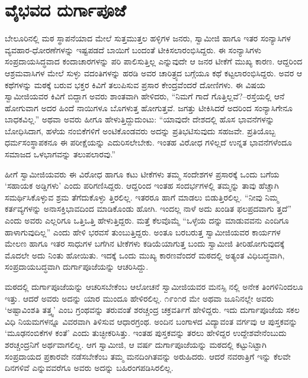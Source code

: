 
\chapter{ವೈಭವದ ದುರ್ಗಾಪೂಜೆ}

\noindent

ಬೇಲೂರಿನಲ್ಲಿ ಮಠ ಸ್ಥಾಪನೆಯಾದ ಮೇಲೆ ಸುತ್ತಮುತ್ತಲ ಹಳ್ಳಿಗಳ ಜನರು, ಸ್ವಾಮೀಜಿ ಹಾಗೂ ಇತರ ಸಂನ್ಯಾಸಿಗಳ ವ್ಯವಹಾರ-ಧೋರಣೆಗಳನ್ನು ಇಷ್ಟಪಡದೆ ಬಾಯಿಗೆ ಬಂದಂತೆ ಟೀಕಿಸಲಾರಂಭಿಸಿದ್ದರು. ಈ ಸಂನ್ಯಾಸಿಗಳು ಸಂಪ್ರದಾಯಸಿದ್ಧವಾದ ಕಂದಾಚಾರಗಳನ್ನು ಪರಿ ಪಾಲಿಸುತ್ತಿಲ್ಲ ಎನ್ನುವುದೇ ಆ ಜನರ ಟೀಕೆಗೆ ಮುಖ್ಯ ಕಾರಣ. ಆದ್ದರಿಂದ ಆಶ್ರಮವಾಸಿಗಳ ಮೇಲೆ ಸುಳ್ಳು ವದಂತಿಗಳನ್ನು ಹರಡಿ ಅವರ ಚಾರಿತ್ರ್ಯದ ಬಗ್ಗೆಯೂ ಕಥೆ ಕಟ್ಟಲಾರಂಭಿಸಿದ್ದರು. ಅವರ ಆ ಕಥೆಗಳನ್ನು ಮಠಕ್ಕೆ ಬರುವ ಭಕ್ತರ ಕಿವಿಗೆ ತಲುಪಿಸುವ ಪ್ರಸಾರ ಕೇಂದ್ರವೆಂದರೆ ದೋಣಿಗಳು. ಈ ವಿಷಯ ಸ್ವಾಮೀಜಿಯವರ ಕಿವಿಗೆ ಬಿದ್ದಾಗ ಅವರು ಶಾಂತವಾಗಿ ಹೇಳಿದರು, “ನಿಮಗೆ ಗಾದೆ ಗೊತ್ತಿಲ್ಲವೆ?–ರಸ್ತೆಯಲ್ಲಿ ಆನೆ ಹೋಗುವಾಗ ಅದರ ಹಿಂದೆ ನಾಯಿಗಳೂ ಬೊಗಳುತ್ತ ಹೋಗುತ್ತವೆ. ಜಗತ್ತು ಟೀಕಿಸಿದರೆ ಅದರಿಂದ ಸಂನ್ಯಾಸಿಗೇನೂ ಬಾಧಕವಿಲ್ಲ.” ಅಥವಾ ಅವರು ಹೀಗೂ ಹೇಳುತ್ತಿದ್ದುದುಂಟು: “ಯಾವುದೇ ದೇಶದಲ್ಲಿ ಹೊಸ ಭಾವನೆಗಳನ್ನು ಬೋಧಿಸಿದಾಗ, ಹಳೆಯ ನಂಬಿಕೆಗಳಿಗೆ ಅಂಟಿಕೊಂಡವರು ಅದನ್ನು ಪ್ರತಿಭಟಿಸುವುದು ಸಹಜವೇ. ಪ್ರತಿಯೊಬ್ಬ ಧರ್ಮಸಂಸ್ಥಾಪಕನೂ ಈ ಪರೀಕ್ಷೆಯನ್ನು ಎದುರಿಸಲೇಬೇಕು. ಇಂತಹ ವಿರೋಧ ಗಳಿಲ್ಲದೆ ಉನ್ನತ ಭಾವನೆಗಳೆಂದೂ ಸಮಾಜದ ಒಳಭಾಗವನ್ನು ತಲುಪಲಾರವು.”

ಹೀಗೆ ಸ್ವಾಮೀಜಿಯವರು ಈ ವಿರೋಧ ಹಾಗೂ ಕಟು ಟೀಕೆಗಳು ತಮ್ಮ ಸಂದೇಶಗಳ ಪ್ರಸಾರಕ್ಕೆ ಒಂದು ಬಗೆಯ ‘ಸಹಾಯಕ ಅಡ್ಡಿಗಳು’ ಎಂದು ಪರಿಗಣಿಸಿದ್ದರು. ಆದ್ದರಿಂದ ಇಂತಹ ಸಂದರ್ಭಗಳಲ್ಲಿ ತಮ್ಮನ್ನು ತಾವು ಹೆಚ್ಚಾಗಿ ಸಮರ್ಥಿಸಿಕೊಳ್ಳುವ ಶ್ರಮ ತೆಗೆದುಕೊಳ್ಳು ತ್ತಿರಲಿಲ್ಲ. ಇತರರೂ ಹಾಗೆ ಮಾಡಲು ಬಿಡುತ್ತಿರಲಿಲ್ಲ. “ನೀವು ನಿಮ್ಮ ಕರ್ತವ್ಯಗಳನ್ನು ಅನಾಸಕ್ತಿಭಾವದಿಂದ ಮಾಡಿಕೊಂಡು ಹೋಗಿ. ಇಂದಲ್ಲ ನಾಳೆ ಅದು ಖಂಡಿತ ಫಲಪ್ರದವಾಗು ತ್ತದೆ” ಎಂದು ಅವರು ಎಲ್ಲರಿಗೂ ಒತ್ತಿಒತ್ತಿ ಹೇಳುತ್ತಿದ್ದರು. ಮತ್ತೆ ಕೆಲವೊಮ್ಮೆ “ಒಳ್ಳೆಯ ದನ್ನು ಮಾಡುವವನು ಎಂದಿಗೂ ಹಾಳಾಗುವುದಿಲ್ಲ” ಎಂದು ಹೇಳಿ ಭರವಸೆ ತುಂಬುತ್ತಿದ್ದರು. ಅಂತೂ ಬರಬರುತ್ತ ಸ್ವಾಮೀಜಿಯವರ ಕಾರ್ಯಗಳ ಮೇಲಣ ಹಾಗೂ ಇತರ ಸಾಧುಗಳ ಬಗೆಗಿನ ಟೀಕೆಗಳು ಕಡಿಯೆಯಾಗುತ್ತ ಬಂದು ಸ್ವಾಮೀಜಿ ತೀರಿಹೋಗುವುದಕ್ಕೆ ಮೊದಲೇ ಅದು ನಿಂತು ಹೋಯಿತು. ಇದಕ್ಕೆ ಒಂದು ಮುಖ್ಯ ಕಾರಣವೆಂದರೆ ಮಠದಲ್ಲಿ ಅತ್ಯಂತ ವಿಧಿಬದ್ಧವಾಗಿ, ಸಂಪ್ರದಾಯಬದ್ಧವಾಗಿ ದುರ್ಗಾಪೂಜೆಯನ್ನು ಆಚರಿಸಿದ್ದು.

ಮಠದಲ್ಲಿ ದುರ್ಗಾಪೂಜೆಯನ್ನು ಆಚರಿಸಬೇಕೆಂಬ ಆಲೋಚನೆ ಸ್ವಾಮೀಜಿಯವರ ಮನಸ್ಸಿ ನಲ್ಲಿ ಅನೇಕ ತಿಂಗಳಿನಿಂದಲೂ ಇತ್ತು. ಆದರೆ ಅವರು ಅದನ್ನು ಯಾರ ಮುಂದೂ ಹೇಳಿರಲಿಲ್ಲ. ೧೯ಂ೧ರ ಮೇ ಅಥವಾ ಜೂನಿನಲ್ಲೇ ಅವರು ‘ಅಷ್ಟಾವಿಂಶತಿ ತತ್ತ್ವ’ ಎಂಬ ಗ್ರಂಥವನ್ನು ತರುವಂತೆ ಶರಚ್ಚಂದ್ರ ಚಕ್ರವರ್ತಿಗೆ ಹೇಳಿದ್ದರು. ಇದು ದುರ್ಗಾಪೂಜೆಯ ಸಕಲ ವಿಧಿ ನಿಯಮಗಳನ್ನೂ ವಿವರವಾಗಿ ತಿಳಿಸುವ ಆಧಾರಗ್ರಂಥ. ಅಂದಿನ ಬಂಗಾಳದ ವಿದ್ಯಾವಂತ ವರ್ಗವು ಆ ಪುಸ್ತಕವನ್ನು ‘ಮೂಢನಂಬಿಕೆಗಳ ಕಂತೆ’ ಎಂದು ತುಚ್ಛೀಕರಿಸಿತ್ತು. ಇಂತಹ ಪುಸ್ತಕವನ್ನು ತರಲು ಹೇಳಿದ್ದರ ಉದ್ದೇಶವೇನೆಂಬುದು ಶರಚ್ಚಂದ್ರನಿಗೆ ಅರ್ಥವಾಗಲಿಲ್ಲ. ಆಗ ಸ್ವಾಮೀಜಿ, ಆ ವರ್ಷ ದುರ್ಗಾಪೂಜೆಯನ್ನು ಮಠದಲ್ಲಿ ಕಟ್ಟುನಿಟ್ಟಾಗಿ ಸಂಪ್ರದಾಯದ ಪ್ರಕಾರವೇ ನಡೆಸಬೇಕೆಂಬ ತಮ್ಮ ಮನದಿಂಗಿತವನ್ನು ಅರುಹಿದರು. ಆದರೆ ನವರಾತ್ರಿಗೆ ಇನ್ನು ಕೆಲವೇ ದಿನಗಳಿವೆ ಎನ್ನುವವರೆಗೂ ಅವರು ಅದನ್ನು ಬಹಿರಂಗಪಡಿಸಿರಲಿಲ್ಲ.

